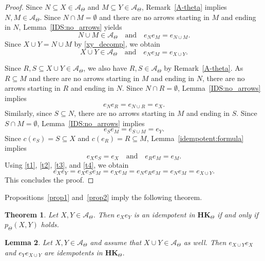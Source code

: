 \documentclass[pdflatex,sn-mathphys-num]{sn-jnl}
\newcommand{\hk}{\mathbf{HK}_{\Theta}}
\newtheorem{theorem}{Theorem}[section]
\newtheorem{lemma}[theorem]{Lemma}
\theoremstyle{definition}
\theoremstyle{remark}
\begin{document}
\begin{proof}
   Since $N \subseteq X \in \mathcal{A}_{\Theta}$ and 
   $M \subseteq Y \in \mathcal{A}_{\Theta}$, Remark~\ref{A-theta} implies $N, M \in \mathcal{A}_{\Theta}$.
   Since $N \cap M = \emptyset$ and there are no arrows starting in $M$ and ending in $N$, Lemma~\ref{IDS:no_arrows} yields 
   \[
   N \cup M \in \mathcal{A}_{\Theta} \quad \text{and} \quad e_N e_M = e_{N \cup M}.
   \]
   Since $X \cup Y = N \cup M$ by \eqref{xy_decomp}, we obtain 
   \begin{equation}\label{t1}
      X \cup Y \in \mathcal{A}_{\Theta} \quad \text{and} \quad e_N e_M = e_{X \cup Y}.
   \end{equation}
   
   Since $R, S \subseteq X \cup Y \in \mathcal{A}_{\Theta}$, we also have $R, S \in \mathcal{A}_{\Theta}$ by Remark~\ref{A-theta}.
   As $R \subseteq M$ and there are no arrows starting in $M$ and ending in $N$, there are no arrows starting in $R$ and ending in $N$.
   Since $N \cap R = \emptyset$, Lemma~\ref{IDS:no_arrows} implies 
   \begin{equation}\label{t2}
      e_N e_R = e_{N \cup R} = e_X.
   \end{equation}
   Similarly, since $S \subseteq N$, there are no arrows starting in $M$ and ending in $S$.
   Since $S \cap M = \emptyset$, Lemma~\ref{IDS:no_arrows} implies 
   \begin{equation}\label{t3}
      e_S e_M = e_{S \cup M} = e_Y.
   \end{equation}
   Since $c(e_S) = S \subseteq X$ and $c(e_R) = R \subseteq M$, Lemma~\ref{idempotent:formula} implies 
   \begin{equation}\label{t4}
      e_X e_S = e_X \quad \text{and} \quad e_R e_M = e_M.
   \end{equation}
   Using \eqref{t1}, \eqref{t2}, \eqref{t3}, and \eqref{t4}, we obtain
   \[
   e_X e_Y = e_X e_S e_M = e_X e_M = e_N e_R e_M = e_N e_M = e_{X \cup Y}.
   \]
   This concludes the proof.
\end{proof}

Propositions~\ref{prop1} and~\ref{prop2} imply the following theorem.
\begin{theorem}\label{ide-p}
   Let $X, Y \in \mathcal{A}_{\Theta}$.
   Then $e_X e_Y$ is an idempotent in $\hk$ if and only if $p_{\Theta}(X, Y)$ holds.
\end{theorem}

\begin{lemma}\label{lemma:join}
   Let $X, Y \in \mathcal{A}_{\Theta}$ and assume that $X \cup Y \in \mathcal{A}_{\Theta}$ as well.
   Then $e_{X \cup Y} e_X$ and $e_Y e_{X \cup Y}$ are idempotents in $\hk$.
\end{lemma}
\end{document}
